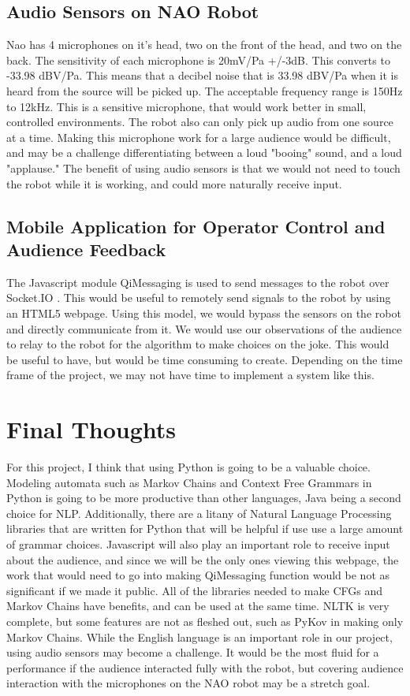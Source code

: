 \documentclass[onecolumn, draftclsnofoot,10pt, compsoc]{IEEEtran}
\begin{document}
  \subsection{Audio Sensors on NAO Robot}
    Nao has 4 microphones on it's head, two on the front of the head, and two on the back. The sensitivity of each microphone is 20mV/Pa +/-3dB. This converts to -33.98 dBV/Pa. This means that a decibel noise that is 33.98 dBV/Pa when it is heard from the source will be picked up. The acceptable frequency range is 150Hz to 12kHz. This is a sensitive microphone, that would work better in small, controlled environments. The robot also can only pick up audio from one source at a time. Making this microphone work for a large audience would be difficult, and may be a challenge differentiating between a loud "booing" sound, and a loud "applause." The benefit of using audio sensors is that we would not need to touch the robot while it is working, and could more naturally receive input.
  \subsection{Mobile Application for Operator Control and Audience Feedback}

  The Javascript module QiMessaging \cite{qimessagingjavascript} is used to send messages to the robot over Socket.IO \cite{socketIO}. This would be useful to remotely send signals to the robot by using an HTML5 webpage. Using this model, we would bypass the sensors on the robot and directly communicate from it. We would use our observations of the audience to relay to the robot for the algorithm to make choices on the joke. This would be useful to have, but would be time consuming to create. Depending on the time frame of the project, we may not have time to implement a system like this.


\section{Final Thoughts}

  For this project, I think that using Python is going to be a valuable choice. Modeling automata such as Markov Chains and Context Free Grammars in Python is going to be more productive than other languages, Java being a second choice for NLP. Additionally, there are a litany of Natural Language Processing libraries that are written for Python that will be helpful if use use a large amount of grammar choices. Javascript will also play an important role to receive input about the audience, and since we will be the only ones viewing this webpage, the work that would need to go into making QiMessaging function would be not as significant if we made it public. All of the libraries needed to make CFGs and Markov Chains have benefits, and can be used at the same time. NLTK is very complete, but some features are not as fleshed out, such as PyKov in making only Markov Chains. While the English language is an important role in our project, using audio sensors may become a challenge. It would be the most fluid for a performance if the audience interacted fully with the robot, but covering audience interaction with the microphones on the NAO robot may be a stretch goal.
\pagebreak




\end{document}
